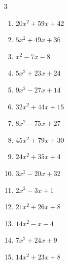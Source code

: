 \begin{multicols}{3}
\begin{enumerate}
  \item $20x^{2}+59x+42$

        \phantom{$=(5x+6)(4x+7)$}

  \item $5x^{2}+49x+36$

        \phantom{$=(x+9)(5x+4)$}

  \item $x^{2}-7x-8$

        \phantom{$=(x-8)(x+1)$}

  \item $5x^{2}+23x+24$

        \phantom{$=(5x+8)(x+3)$}

  \item $9x^{2}-27x+14$

        \phantom{$=(3x-2)(3x-7)$}

  \item $32x^{2}+44x+15$

        \phantom{$=(4x+3)(8x+5)$}

  \item $8x^{2}-75x+27$

        \phantom{$=(8x-3)(x-9)$}

  \item $45x^{2}+79x+30$

        \phantom{$=(9x+5)(5x+6)$}

  \item $24x^{2}+35x+4$

        \phantom{$=(3x+4)(8x+1)$}

\columnbreak %

  \item $3x^{2}-20x+32$

        \phantom{$=(x-4)(3x-8)$}

  \item $2x^{2}-3x+1$

        \phantom{$=(2x-1)(x-1)$}

  \item $21x^{2}+26x+8$

        \phantom{$=(3x+2)(7x+4)$}

  \item $14x^{2}-x-4$

        \phantom{$=(7x-4)(2x+1)$}

  \item $7x^{2}+24x+9$

        \phantom{$=(7x+3)(x+3)$}

  \item $14x^{2}+23x+8$


\end{enumerate}
\end{multicols}
